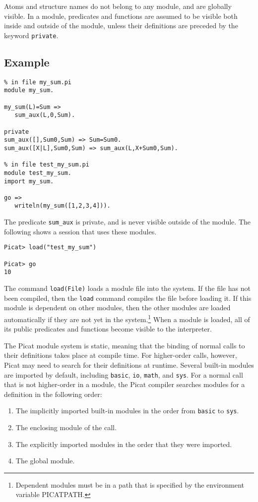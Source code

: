 Atoms and structure names do not belong to any module, and are globally visible. In a module, predicates and functions are assumed to be visible both inside and outside of the module, unless their definitions are preceded by the keyword \texttt{private}. 

\subsection*{Example}
\begin{verbatim}
% in file my_sum.pi
module my_sum.

my_sum(L)=Sum =>
   sum_aux(L,0,Sum).

private
sum_aux([],Sum0,Sum) => Sum=Sum0.
sum_aux([X|L],Sum0,Sum) => sum_aux(L,X+Sum0,Sum).

% in file test_my_sum.pi
module test_my_sum.
import my_sum.

go =>
   writeln(my_sum([1,2,3,4])).
\end{verbatim}

The predicate \texttt{sum\_aux} is private, and is never visible outside of the module. The following shows a session that uses these modules. 
\begin{verbatim}
Picat> load("test_my_sum")

Picat> go
10
\end{verbatim}
The command \texttt{load(File)} loads a module file into the system. If the file has not been compiled, then the \texttt{load} command compiles the file before loading it. If this module is dependent on other modules, then the other modules are loaded automatically if they are not yet in the system.\footnote{Dependent modules must be in a path that is specified by the environment variable PICATPATH.} When a module is loaded, all of its public predicates and functions become visible to the interpreter.

The Picat module system is static, meaning that the binding of normal calls to their definitions takes place at compile time. For higher-order calls, however, Picat may need to search for their definitions at runtime. Several built-in modules are imported by default, including  \texttt{basic}, \texttt{io}, \texttt{math},  and \texttt{sys}. For a normal call that is not higher-order in a module, the Picat compiler searches modules for a definition in the following order:
\begin{enumerate}
\item The implicitly imported built-in modules in the order from \texttt{basic} to \texttt{sys}.
\item The enclosing module of the call.
\item The explicitly imported modules in the order that they were imported.
\item The global module.
\end{enumerate}

